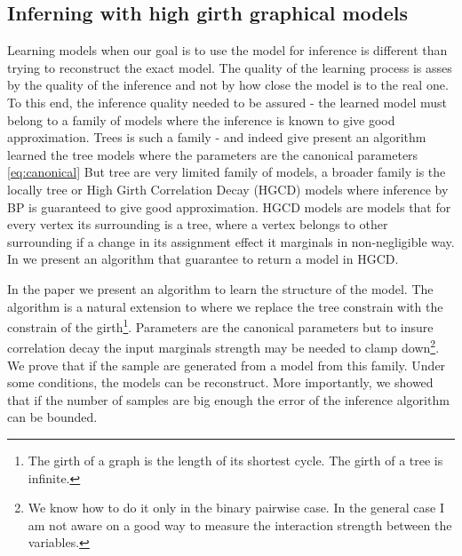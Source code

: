 {\subsection{Inferning with high girth graphical models}
Learning models when our goal is to use the model for inference is different than trying to reconstruct the exact model.
The quality of the learning process is asses by the quality of the inference and not by how close the model is to the real one.
To this end, the inference quality needed to be assured  - the learned  model must belong to a family of models where the inference is known to give good approximation.
Trees is such a family - and indeed \cite{chowLiu} give present an algorithm learned the tree models where the parameters are the canonical parameters \eqref{eq:canonical}
But tree are very limited family of models, a broader family is the locally tree or High Girth Correlation Decay (HGCD) models where inference by BP is guaranteed to give good approximation.
HGCD models are models that for every vertex its surrounding is a tree, where a vertex belongs to other surrounding if a change in its assignment effect it marginals in non-negligible way.
In \cite{heinemann2014inferning} we present an algorithm that guarantee to return a model in HGCD.

In the paper we present an algorithm to learn the structure of the model.
The algorithm is a natural extension to \cite{chowLiu} where we replace the tree constrain with the constrain of the girth\footnote{The girth of a graph is the length of its shortest cycle. The girth of a tree is infinite.}.
Parameters are the canonical parameters but to insure correlation decay the input marginals strength may be needed to clamp down\footnote{We know how to do it only in the binary pairwise case. In the general case I am not aware on a good way to measure the interaction strength between the variables.}.
We prove that if the sample are generated from a model from this family.
Under some conditions, the models can be reconstruct.
More importantly, we showed that if the number of samples are big enough the error of the inference algorithm can be bounded.
}
